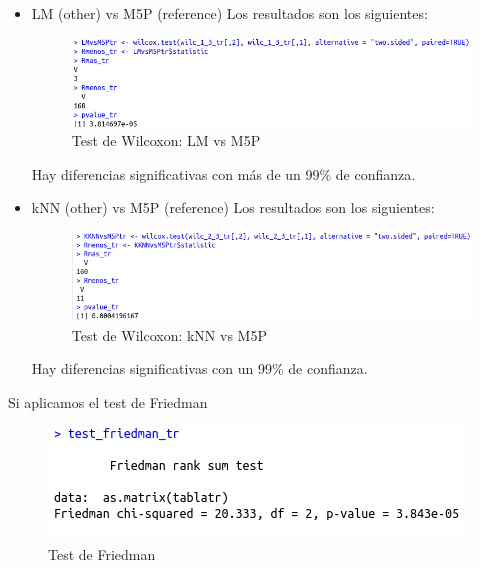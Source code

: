 \begin{itemize}
\begin{itemize}
		\item LM (other) vs M5P (reference)
		Los resultados son los siguientes:
		\begin{figure}[H] %
			\centering
			\includegraphics[scale=0.6]{lmm5p2.png}  %
			\caption{Test de Wilcoxon: LM vs M5P} 
			\label{fig:lmm5p2}
		\end{figure}
		
		Hay diferencias significativas con más de un 99\% de confianza.
		
		\item kNN (other) vs M5P (reference)
		Los resultados son los siguientes:
		\begin{figure}[H] %
			\centering
			\includegraphics[scale=0.6]{knnm5p2.png}  %
			\caption{Test de Wilcoxon: kNN vs M5P} 
			\label{fig:knnm5p2}
		\end{figure}
		Hay diferencias significativas con un 99\% de confianza.
	\end{itemize}
	Si aplicamos el test de Friedman
	
	\begin{figure}[H] %
		\centering
		\includegraphics[scale=0.6]{friedman2.png}  %
		\caption{Test de Friedman} 
		\label{fig:friedman2}
	\end{figure}
	

\end{itemize}
